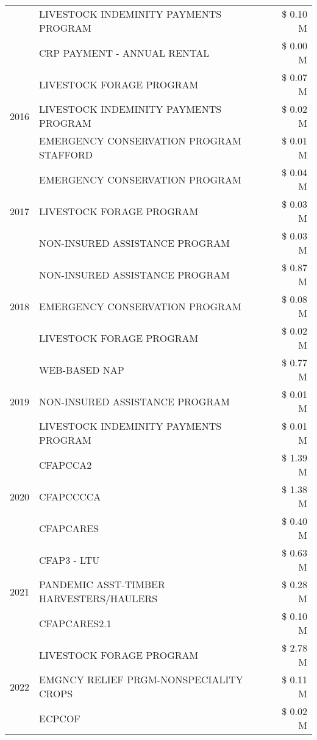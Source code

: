 \begin{tabular}{llr}
 & LIVESTOCK INDEMINITY PAYMENTS PROGRAM & \$ 0.10 M \\
 & CRP PAYMENT - ANNUAL RENTAL & \$ 0.00 M \\
\cline{1-3}
\multirow[t]{3}{*}{2016} & LIVESTOCK FORAGE PROGRAM & \$ 0.07 M \\
 & LIVESTOCK INDEMINITY PAYMENTS PROGRAM & \$ 0.02 M \\
 & EMERGENCY CONSERVATION PROGRAM STAFFORD & \$ 0.01 M \\
\cline{1-3}
\multirow[t]{3}{*}{2017} & EMERGENCY CONSERVATION PROGRAM & \$ 0.04 M \\
 & LIVESTOCK FORAGE PROGRAM & \$ 0.03 M \\
 & NON-INSURED ASSISTANCE PROGRAM & \$ 0.03 M \\
\cline{1-3}
\multirow[t]{3}{*}{2018} & NON-INSURED ASSISTANCE PROGRAM & \$ 0.87 M \\
 & EMERGENCY CONSERVATION PROGRAM & \$ 0.08 M \\
 & LIVESTOCK FORAGE PROGRAM & \$ 0.02 M \\
\cline{1-3}
\multirow[t]{3}{*}{2019} & WEB-BASED NAP & \$ 0.77 M \\
 & NON-INSURED ASSISTANCE PROGRAM & \$ 0.01 M \\
 & LIVESTOCK INDEMINITY PAYMENTS PROGRAM & \$ 0.01 M \\
\cline{1-3}
\multirow[t]{3}{*}{2020} & CFAPCCA2 & \$ 1.39 M \\
 & CFAPCCCCA & \$ 1.38 M \\
 & CFAPCARES & \$ 0.40 M \\
\cline{1-3}
\multirow[t]{3}{*}{2021} & CFAP3 - LTU & \$ 0.63 M \\
 & PANDEMIC ASST-TIMBER HARVESTERS/HAULERS & \$ 0.28 M \\
 & CFAPCARES2.1 & \$ 0.10 M \\
\cline{1-3}
\multirow[t]{3}{*}{2022} & LIVESTOCK FORAGE PROGRAM & \$ 2.78 M \\
 & EMGNCY RELIEF PRGM-NONSPECIALITY CROPS & \$ 0.11 M \\
 & ECPCOF & \$ 0.02 M \\
\cline{1-3}
\bottomrule
\end{tabular}
